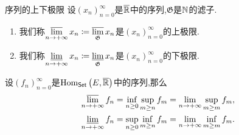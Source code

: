 \begin{definition}{序列的上下极限}{}
	设$\left(x_{n}\right)_{n=0}^{\infty}$是$\overline{\mathbb{R}}$中的序列,$\mathfrak{G}$是$\mathbb{N}$的滤子.
	\begin{enumerate}
		\item 我们称$\varlimsup\limits_{n\to +\infty}x_{n}\coloneq\varlimsup\limits_{\mathfrak{G}}x_{n}$是$\left(x_{n}\right)_{n=0}^{\infty}$的上极限.
		\item 我们称$\varliminf\limits_{n\to +\infty}x_{n}\coloneq\varliminf\limits_{\mathfrak{G}}x_{n}$是$\left(x_{n}\right)_{n=0}^{\infty}$的下极限.
	\end{enumerate}
\end{definition}

\begin{proposition}{}{}
	设$\left(f_{n}\right)_{n=0}^{\infty}$是$\operatorname{Hom}_{\mathsf{Set}}\left(E,\overline{\mathbb{R}}\right)$中的序列,那么
	\begin{gather*}
		\varlimsup\limits_{n\to +\infty}f_{n}=\inf\limits_{n\geq 0}\sup\limits_{m\geq n}f_{m}=\displaystyle\lim_{n\to +\infty}\sup\limits_{m\geq m}f_{m},\\
		\varliminf\limits_{n\to +\infty}f_{n}=\sup\limits_{n\geq 0}\inf\limits_{m\geq n}f_{m}=\displaystyle\lim_{n\to +\infty}\inf\limits_{m\geq m}f_{m}.
	\end{gather*}
\end{proposition}



